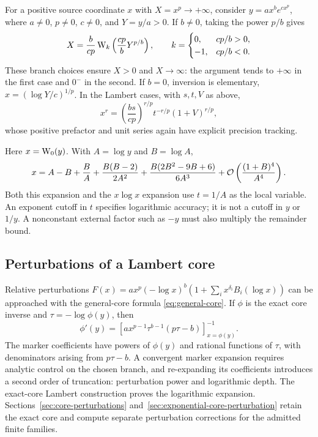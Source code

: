 For a positive source coordinate $x$ with $X=x^p\to+\infty$, consider $y=a x^b e^{c x^p}$, where $a\ne0$, $p\ne0$, $c\ne0$, and $Y=y/a>0$. If $b\ne0$, taking the power $p/b$ gives
\begin{equation}
 X=\frac{b}{cp}\,\mathrm W_k\left(\frac{cp}{b}Y^{p/b}\right),\qquad
 k=\begin{cases}0,&cp/b>0,\\-1,&cp/b<0.\end{cases}
 \label{eq:exponential-core}
\end{equation}
These branch choices ensure $X>0$ and $X\to\infty$: the argument tends to $+\infty$ in the first case and $0^-$ in the second. If $b=0$, inversion is elementary, $x=(\log Y/c)^{1/p}$. In the Lambert cases, with $s,t,V$ as above,
\[
 x^r=\left(\frac{bs}{cp}\right)^{r/p}t^{-r/p}(1+V)^{r/p},
\]
whose positive prefactor and unit series again have explicit precision tracking.

\begin{example}
Here $x=\mathrm W_0(y)$. With $A=\log y$ and $B=\log A$,
\[
 x=A-B+\frac{B}{A}+\frac{B(B-2)}{2A^2}
 +\frac{B(2B^2-9B+6)}{6A^3}
 +\mathcal O\left(\frac{(1+B)^4}{A^4}\right).
\]
Both this expansion and the $x\log x$ expansion use $t=1/A$ as the local variable. An exponent cutoff in $t$ specifies logarithmic accuracy; it is not a cutoff in $y$ or $1/y$. A nonconstant external factor such as $-y$ must also multiply the remainder bound.
\end{example}

\subsection{Perturbations of a Lambert core}

Relative perturbations $F(x)=ax^p(-\log x)^b(1+\sum_i x^{\delta_i}B_i(\log x))$ can be approached with the general-core formula \eqref{eq:general-core}. If $\phi$ is the exact core inverse and $\tau=-\log\phi(y)$, then
\[
 \phi'(y)=\left[a x^{p-1}\tau^{b-1}(p\tau-b)\right]^{-1}_{x=\phi(y)}.
\]
The marker coefficients have powers of $\phi(y)$ and rational functions of $\tau$, with denominators arising from $p\tau-b$. A convergent marker expansion requires analytic control on the chosen branch, and re-expanding its coefficients introduces a second order of truncation: perturbation power and logarithmic depth. The exact-core Lambert construction proves the logarithmic expansion. Sections~\ref{sec:core-perturbations} and~\ref{sec:exponential-core-perturbation} retain the exact core and compute separate perturbation corrections for the admitted finite families.

